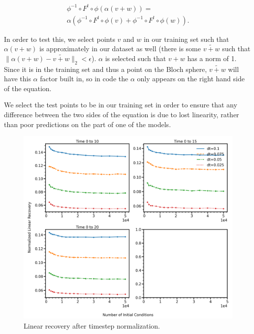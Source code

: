 \documentclass[11pt]{article} %
\numberwithin{equation}{section}  %
\begin{document}
\begin{multicols}{2}
\begin{multline}\label{linear_eqn}
\phi^{-1}\circ F^t\circ \phi(\alpha(v+w))=\\ 
\alpha(\phi^{-1}\circ F^t\circ \phi(v) + \phi^{-1}\circ F^t\circ \phi(w)).
\end{multline}


In order to test this, we select points $v$ and $w$ in our training set such that $\alpha(v+w)$ is approximately in our dataset as well (there is some $\widetilde{v+w}$ such that $\|\alpha(v+w)-\widetilde{v+w}\|_2 < \epsilon$).  $\alpha$ is selected such that $v+w$ has a norm of 1.  Since it is in the training set and thus a point on the Bloch sphere, $\widetilde{v+w}$ will have this $\alpha$ factor built in, so in code the $\alpha$ only appears on the right hand side of the equation.

We select the test points to be in our training set in order to ensure that any difference between the two sides of the equation is due to lost linearity, rather than poor predictions on the part of one of the models.

\end{multicols}

\begin{figure}
	\centering
	
	\includegraphics[width=\linewidth]{figures/norm_linear_recovery}
	
	\caption{Linear recovery after timestep normalization.}\label{norm_linear_recovery}
\end{figure}
\end{document}
